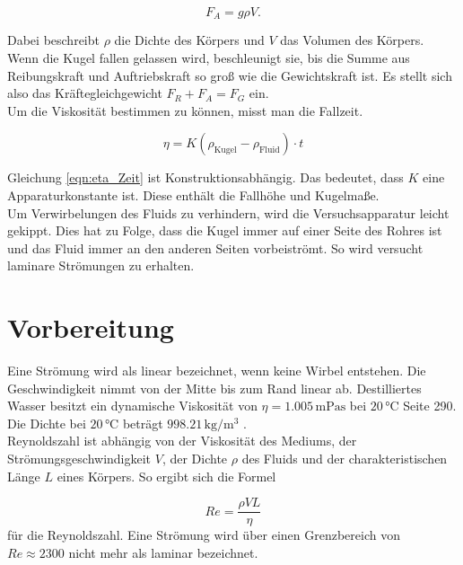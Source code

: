 \begin{equation*}
    F_A = g \rho V.
\end{equation*}

\noindent
Dabei beschreibt $\rho$ die Dichte des Körpers und $V$ das Volumen des Körpers.\\
\noindent
Wenn die Kugel fallen gelassen wird, beschleunigt sie, bis die Summe aus Reibungskraft und Auftriebskraft so groß wie die Gewichtskraft 
ist. Es stellt sich also das Kräftegleichgewicht $F_R + F_A = F_G$ ein.\\
\noindent
Um die Viskosität bestimmen zu können, misst man die Fallzeit.

\begin{equation}
    \eta = K(\rho_\text{Kugel} - \rho_\text{Fluid}) \cdot t
    \label{eqn:eta_Zeit}
\end{equation}

\noindent
Gleichung \eqref{eqn:eta_Zeit} ist Konstruktionsabhängig. Das bedeutet, dass $K$ eine Apparaturkonstante ist. Diese enthält die Fallhöhe 
und Kugelmaße.\\

\noindent
Um Verwirbelungen des Fluids zu verhindern, wird die Versuchsapparatur leicht gekippt. Dies hat zu Folge, dass die Kugel immer auf einer 
Seite des Rohres ist und das Fluid immer an den anderen Seiten vorbeiströmt. So wird versucht laminare Strömungen zu erhalten.

\section{Vorbereitung}
Eine Strömung wird als linear bezeichnet, wenn keine Wirbel entstehen. Die Geschwindigkeit nimmt von der Mitte bis zum Rand linear ab.
Destilliertes Wasser besitzt ein dynamische Viskosität von $\eta = 1.005\, \unit{\milli \pascal \second}$ bei $20\, \unit{\celsius}$ 
\cite{Physikalisches_Praktikum} Seite 290. Die Dichte bei $20\, \unit{\celsius}$ beträgt $998.21\, \unit{\kilo \gram \per \cubic \meter}$
\cite{Physikalisches_Praktikum}.\\
\noindentDie Reynoldszahl ist abhängig von der Viskosität des Mediums, der Strömungsgeschwindigkeit $V$, der Dichte $\rho$ des Fluids und der 
charakteristischen Länge $L$ eines Körpers. So ergibt sich die Formel 

\begin{equation}
    Re = \frac{\rho V L}{\eta}
    \label{eqn:Reynolds}
\end{equation}
für die Reynoldszahl. Eine Strömung wird über einen Grenzbereich von $Re \approx 2300$ nicht mehr als laminar bezeichnet.

